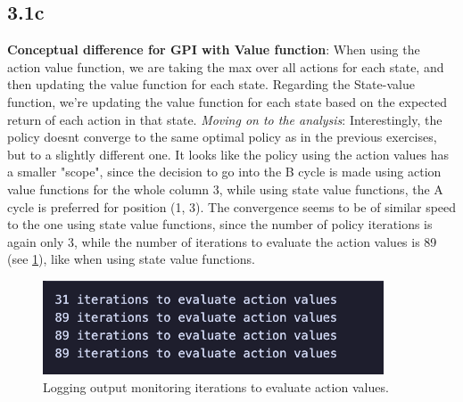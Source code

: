 \documentclass{article} %
\begin{document}
	\newpage
	
	\subsection{3.1c}
	\textbf{Conceptual difference for GPI with Value function}: \newline
	When using the action value function, we are taking the max over all actions for each state, and then updating the value function for each state. Regarding the State-value function, we're updating the value function for each state based on the expected return of each action in that state.\newline
	\textit{Moving on to the analysis}: \newline
	Interestingly, the policy doesnt converge to the same optimal policy as in the previous exercises, but to a slightly different one. It looks like the policy using the action values has a smaller "scope", since the decision to go into the B cycle is made using action value functions for the whole column 3, while using state value functions, the A cycle is preferred for position (1, 3). 
	The convergence seems to be of similar speed to the one using state value functions, since the number of policy iterations is again only 3, while the number of iterations to evaluate the action values is 89 (see \ref{fig:11}), like when using state value functions.
	
	
	\begin{figure}[h!]
		\centering
		\includegraphics[width=0.9\textwidth]{images/3.1c.4.png}
		\caption{Logging output monitoring iterations to evaluate action values.}
		\label{fig:11}
	\end{figure}
	
\end{document}
